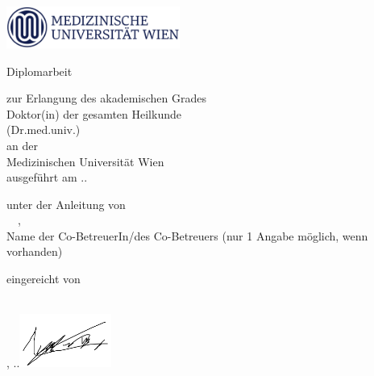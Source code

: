 \documentclass[a4paper,12pt]{scrreprt}
\title{\workTitle}
\date{\dateYear-\dateMonth-\dateDay}
\author{\studentFirstName \studentLastName}
\begin{document}
\begin{titlepage}
    \color{MDWblue}
    \includegraphics[width=5.7cm]{uni-logo.png}

    \begin{center}
        \vspace*{1cm}

        \large Diplomarbeit \\
        \vspace{0.5cm}
        \Large\textbf{\workTitle}

        \vspace{3cm}

        \small zur Erlangung des akademischen Grades \\
        \large
        Doktor(in) der gesamten Heilkunde \\
        (Dr.med.univ.) \\
        \vspace{0.3cm}
        \small an der \\
        \large Medizinischen Universität Wien \\
        \vspace{0.3cm}
        \small
        ausgeführt am \dateDay.\dateMonth.\dateYear \\
        \location

        \vspace{1cm}

        unter der Anleitung von \\
        \advisorPreTitle\ \advisoFirstName\ \advisorLastName \if\advisorPosTitle\empty\else, \advisorPosTitle \fi \\
        Name der Co-BetreuerIn/des Co-Betreuers (nur 1 Angabe möglich, wenn vorhanden) \\

        \vspace{1cm}

        eingereicht von \\
        \textbf{\studentFirstName\ \studentLastName} \\
        \studentId

        \vfill

        \hfill\place, \dateDay.\dateMonth.\dateYear \hfill \includegraphics[width=3cm]{signature.png}
        \\[3.5cm]

    \end{center}
\end{titlepage}
\end{document}
